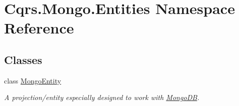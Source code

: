 \hypertarget{namespaceCqrs_1_1Mongo_1_1Entities}{}\section{Cqrs.\+Mongo.\+Entities Namespace Reference}
\label{namespaceCqrs_1_1Mongo_1_1Entities}
\subsection*{Classes}
\begin{DoxyCompactItemize}
\item 
class \hyperlink{classCqrs_1_1Mongo_1_1Entities_1_1MongoEntity}{Mongo\+Entity}
\begin{DoxyCompactList}\small\item\em A projection/entity especially designed to work with \hyperlink{namespaceCqrs_1_1MongoDB}{Mongo\+DB}. \end{DoxyCompactList}\end{DoxyCompactItemize}
